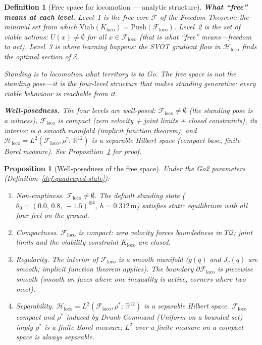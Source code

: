 \documentclass[11pt,a4paper]{article}
\newtheorem{proposition}[theorem]{Proposition}
\newtheorem{definition}[theorem]{Definition}
\newcommand{\R}{\mathbb{R}}
\newcommand{\cF}{\mathcal{F}}
\newcommand{\cE}{\mathcal{E}}
\newcommand{\cH}{\mathcal{H}}
\begin{document}
\begin{definition}[Free space for locomotion --- analytic structure]
\medskip\noindent
\textbf{What ``free'' means at each level.}\;
Level~1 is the free core $\cF$ of the Freedom Theorem:
the minimal set from which
$\mathrm{Viab}(K_{\mathrm{loco}})
  = \mathrm{Push}(\cF_{\mathrm{loco}})$.
Level~2 is the set of viable actions:
$U(x) \neq \emptyset$
for all $x \in \cF_{\mathrm{loco}}$
(that is what ``free'' means---freedom to act).
Level~3 is where learning happens:
the SVOT gradient flow in $\cH_{\mathrm{loco}}$
finds the optimal section of $\cE$.

Standing is to locomotion what territory is to Go.
The free space is not the standing pose---it is
the four-level structure that makes standing
\emph{generative}:
every viable behaviour is reachable from it.

\medskip\noindent
\textbf{Well-posedness.}\;
The four levels are well-posed:
$\cF_{\mathrm{loco}} \neq \emptyset$
(the standing pose is a witness),
$\cF_{\mathrm{loco}}$ is compact
(zero velocity + joint limits + closed constraints),
its interior is a smooth manifold
(implicit function theorem),
and
$\cH_{\mathrm{loco}}
  = L^2(\cF_{\mathrm{loco}}, \rho^*;\, \R^{12})$
is a separable Hilbert space
(compact base, finite Borel measure).
See Proposition~\ref{prop:free-space-wp} for proof.
\end{definition}


\begin{proposition}[Well-posedness of the free space]
\label{prop:free-space-wp}
Under the Go2 parameters
(Definition~\ref{def:quadruped-state}):
\begin{enumerate}[label=(\roman*),nosep]
\item \emph{Non-emptiness.}\;
  $\cF_{\mathrm{loco}} \neq \emptyset$.
  The default standing state
  ($\theta_0 = (0.0,\, 0.8,\, {-}1.5)^{\otimes 4}$,
  $h = 0.312\,\mathrm{m}$)
  satisfies static equilibrium with all four feet
  on the ground.
\item \emph{Compactness.}\;
  $\cF_{\mathrm{loco}}$ is compact:
  zero velocity forces boundedness in $T\mathcal{Q}$;
  joint limits and the viability constraint
  $K_{\mathrm{loco}}$ are closed.
\item \emph{Regularity.}\;
  The interior of $\cF_{\mathrm{loco}}$
  is a smooth manifold
  ($g(q)$ and $J_c(q)$ are smooth;
  implicit function theorem applies).
  The boundary $\partial \cF_{\mathrm{loco}}$
  is piecewise smooth
  (smooth on faces where one inequality
  is active, corners where two meet).
\item \emph{Separability.}\;
  $\cH_{\mathrm{loco}}
  = L^2(\cF_{\mathrm{loco}}, \rho^*;\, \R^{12})$
  is a separable Hilbert space.
  $\cF_{\mathrm{loco}}$ compact
  and $\rho^*$ induced by Drunk Command
  (Uniform on a bounded set)
  imply $\rho^*$ is a finite Borel measure;
  $L^2$ over a finite measure on a compact space
  is always separable.
\end{enumerate}
\end{proposition}
\end{document}
